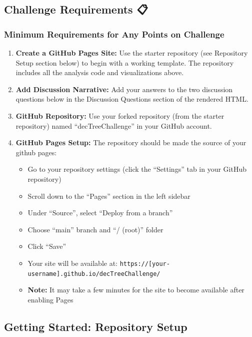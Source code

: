 \documentclass[
  letterpaper,
  DIV=11,
  numbers=noendperiod]{scrartcl}
\providecommand{\tightlist}{%
  \setlength{\itemsep}{0pt}\setlength{\parskip}{0pt}}
\begin{document}
\subsection{Challenge Requirements 📋}\label{challenge-requirements}

\subsubsection{Minimum Requirements for Any Points on
Challenge}\label{minimum-requirements-for-any-points-on-challenge}

\begin{enumerate}
\def\labelenumi{\arabic{enumi}.}
\item
  \textbf{Create a GitHub Pages Site:} Use the starter repository (see
  Repository Setup section below) to begin with a working template. The
  repository includes all the analysis code and visualizations above.
\item
  \textbf{Add Discussion Narrative:} Add your answers to the two
  discussion questions below in the Discussion Questions section of the
  rendered HTML.
\item
  \textbf{GitHub Repository:} Use your forked repository (from the
  starter repository) named ``decTreeChallenge'' in your GitHub account.
\item
  \textbf{GitHub Pages Setup:} The repository should be made the source
  of your github pages:

  \begin{itemize}
  \tightlist
  \item
    Go to your repository settings (click the ``Settings'' tab in your
    GitHub repository)
  \item
    Scroll down to the ``Pages'' section in the left sidebar
  \item
    Under ``Source'', select ``Deploy from a branch''
  \item
    Choose ``main'' branch and ``/ (root)'' folder
  \item
    Click ``Save''
  \item
    Your site will be available at:
    \texttt{https://{[}your-username{]}.github.io/decTreeChallenge/}
  \item
    \textbf{Note:} It may take a few minutes for the site to become
    available after enabling Pages
  \end{itemize}
\end{enumerate}

\subsection{Getting Started: Repository Setup
🚀}\label{getting-started-repository-setup}
\end{document}
